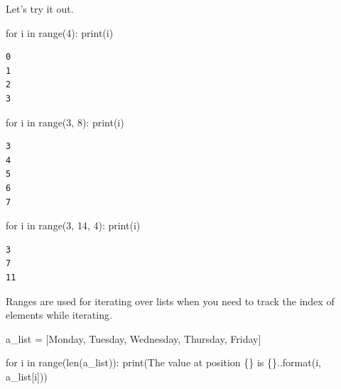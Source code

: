 \documentclass[
  letterpaper,
  DIV=11,
  numbers=noendperiod]{scrreprt}
\newenvironment{Shaded}{\begin{snugshade}}{\end{snugshade}}
\newcommand{\BuiltInTok}[1]{\textcolor[rgb]{0.00,0.23,0.31}{#1}}
\newcommand{\ControlFlowTok}[1]{\textcolor[rgb]{0.00,0.23,0.31}{#1}}
\newcommand{\DecValTok}[1]{\textcolor[rgb]{0.68,0.00,0.00}{#1}}
\newcommand{\KeywordTok}[1]{\textcolor[rgb]{0.00,0.23,0.31}{#1}}
\newcommand{\NormalTok}[1]{\textcolor[rgb]{0.00,0.23,0.31}{#1}}
\newcommand{\OperatorTok}[1]{\textcolor[rgb]{0.37,0.37,0.37}{#1}}
\newcommand{\SpecialCharTok}[1]{\textcolor[rgb]{0.37,0.37,0.37}{#1}}
\newcommand{\StringTok}[1]{\textcolor[rgb]{0.13,0.47,0.30}{#1}}
\begin{document}
Let's try it out.

\begin{Shaded}
\begin{Highlighting}[]
\ControlFlowTok{for}\NormalTok{ i }\KeywordTok{in} \BuiltInTok{range}\NormalTok{(}\DecValTok{4}\NormalTok{):}
    \BuiltInTok{print}\NormalTok{(i)}
\end{Highlighting}
\end{Shaded}

\begin{verbatim}
0
1
2
3
\end{verbatim}

\begin{Shaded}
\begin{Highlighting}[]
\ControlFlowTok{for}\NormalTok{ i }\KeywordTok{in} \BuiltInTok{range}\NormalTok{(}\DecValTok{3}\NormalTok{, }\DecValTok{8}\NormalTok{):}
    \BuiltInTok{print}\NormalTok{(i)}
\end{Highlighting}
\end{Shaded}

\begin{verbatim}
3
4
5
6
7
\end{verbatim}

\begin{Shaded}
\begin{Highlighting}[]
\ControlFlowTok{for}\NormalTok{ i }\KeywordTok{in} \BuiltInTok{range}\NormalTok{(}\DecValTok{3}\NormalTok{, }\DecValTok{14}\NormalTok{, }\DecValTok{4}\NormalTok{):}
    \BuiltInTok{print}\NormalTok{(i)}
\end{Highlighting}
\end{Shaded}

\begin{verbatim}
3
7
11
\end{verbatim}

Ranges are used for iterating over lists when you need to track the
index of elements while iterating.

\begin{Shaded}
\begin{Highlighting}[]
\NormalTok{a\_list }\OperatorTok{=}\NormalTok{ [}\StringTok{\textquotesingle{}Monday\textquotesingle{}}\NormalTok{, }\StringTok{\textquotesingle{}Tuesday\textquotesingle{}}\NormalTok{, }\StringTok{\textquotesingle{}Wednesday\textquotesingle{}}\NormalTok{, }\StringTok{\textquotesingle{}Thursday\textquotesingle{}}\NormalTok{, }\StringTok{\textquotesingle{}Friday\textquotesingle{}}\NormalTok{]}

\ControlFlowTok{for}\NormalTok{ i }\KeywordTok{in} \BuiltInTok{range}\NormalTok{(}\BuiltInTok{len}\NormalTok{(a\_list)):}
    \BuiltInTok{print}\NormalTok{(}\StringTok{\textquotesingle{}The value at position }\SpecialCharTok{\{\}}\StringTok{ is }\SpecialCharTok{\{\}}\StringTok{.\textquotesingle{}}\NormalTok{.}\BuiltInTok{format}\NormalTok{(i, a\_list[i]))}
\end{Highlighting}
\end{Shaded}
\end{document}
